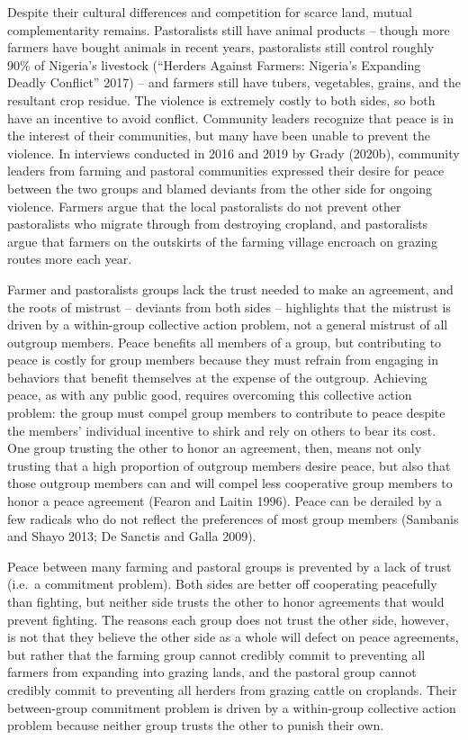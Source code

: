 \documentclass[11pt]{article}
\begin{document}
Despite their cultural differences and competition for scarce land,
mutual complementarity remains. Pastoralists still have animal products
-- though more farmers have bought animals in recent years, pastoralists
still control roughly 90\% of Nigeria's livestock (``Herders Against
Farmers: Nigeria's Expanding Deadly Conflict'' 2017) -- and farmers
still have tubers, vegetables, grains, and the resultant crop residue.
The violence is extremely costly to both sides, so both have an
incentive to avoid conflict. Community leaders recognize that peace is
in the interest of their communities, but many have been unable to
prevent the violence. In interviews conducted in 2016 and 2019 by Grady
(2020b), community leaders from farming and pastoral communities
expressed their desire for peace between the two groups and blamed
deviants from the other side for ongoing violence. Farmers argue that
the local pastoralists do not prevent other pastoralists who migrate
through from destroying cropland, and pastoralists argue that farmers on
the outskirts of the farming village encroach on grazing routes more
each year.

Farmer and pastoralists groups lack the trust needed to make an
agreement, and the roots of mistrust -- deviants from both sides --
highlights that the mistrust is driven by a within-group collective
action problem, not a general mistrust of all outgroup members. Peace
benefits all members of a group, but contributing to peace is costly for
group members because they must refrain from engaging in behaviors that
benefit themselves at the expense of the outgroup. Achieving peace, as
with any public good, requires overcoming this collective action
problem: the group must compel group members to contribute to peace
despite the members' individual incentive to shirk and rely on others to
bear its cost. One group trusting the other to honor an agreement, then,
means not only trusting that a high proportion of outgroup members
desire peace, but also that those outgroup members can and will compel
less cooperative group members to honor a peace agreement (Fearon and
Laitin 1996). Peace can be derailed by a few radicals who do not reflect
the preferences of most group members (Sambanis and Shayo 2013; De
Sanctis and Galla 2009).

Peace between many farming and pastoral groups is prevented by a lack of
trust (i.e.~a commitment problem). Both sides are better off cooperating
peacefully than fighting, but neither side trusts the other to honor
agreements that would prevent fighting. The reasons each group does not
trust the other side, however, is not that they believe the other side
as a whole will defect on peace agreements, but rather that the farming
group cannot credibly commit to preventing all farmers from expanding
into grazing lands, and the pastoral group cannot credibly commit to
preventing all herders from grazing cattle on croplands. Their
between-group commitment problem is driven by a within-group collective
action problem because neither group trusts the other to punish their
own.
\end{document}
